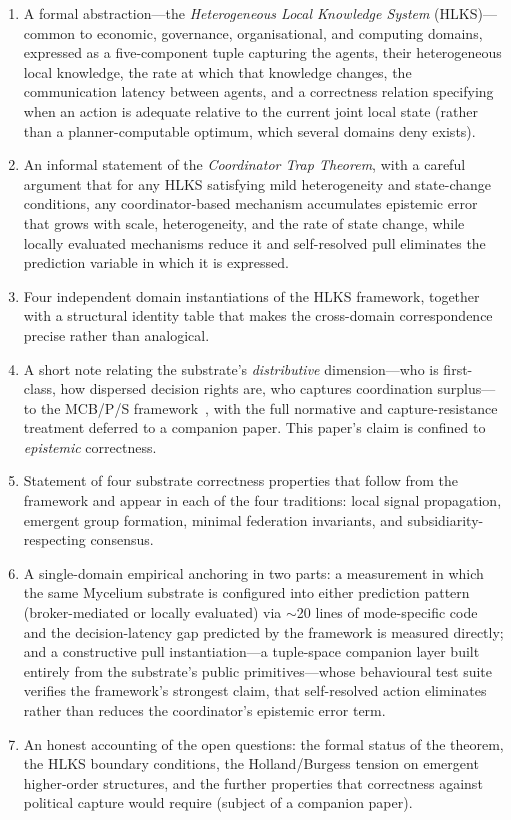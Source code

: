 \documentclass[11pt]{article}
\theoremstyle{definition}
\theoremstyle{plain}
\theoremstyle{plain}
\begin{document}
\begin{enumerate}
\item A formal abstraction---the \emph{Heterogeneous Local Knowledge System}
  (HLKS)---common to economic, governance, organisational, and computing
  domains, expressed as a five-component tuple capturing the agents, their
  heterogeneous local knowledge, the rate at which that knowledge changes, the
  communication latency between agents, and a correctness relation specifying when
  an action is adequate relative to the current joint local state (rather than a
  planner-computable optimum, which several domains deny exists).

\item An informal statement of the \emph{Coordinator Trap Theorem}, with a
  careful argument that for any HLKS satisfying mild heterogeneity and
  state-change conditions, any coordinator-based mechanism accumulates
  epistemic error that grows with scale, heterogeneity, and the rate of
  state change, while locally evaluated mechanisms reduce it and self-resolved pull
  eliminates the prediction variable in which it is expressed.

\item Four independent domain instantiations of the HLKS framework, together
  with a structural identity table that makes the cross-domain correspondence
  precise rather than analogical.

\item A short note relating the substrate's \emph{distributive} dimension---who is
  first-class, how dispersed decision rights are, who captures coordination
  surplus---to the MCB/P/S framework~\cite{nicholson2025}, with the full normative
  and capture-resistance treatment deferred to a companion paper. This paper's claim
  is confined to \emph{epistemic} correctness.

\item Statement of four substrate correctness properties that follow from
  the framework and appear in each of the four traditions: local signal
  propagation, emergent group formation, minimal federation invariants, and
  subsidiarity-respecting consensus.

\item A single-domain empirical anchoring in two parts: a measurement in
  which the same Mycelium substrate is configured into either prediction
  pattern (broker-mediated or locally evaluated) via $\sim$20 lines of
  mode-specific code and the decision-latency gap predicted by the
  framework is measured directly; and a constructive pull
  instantiation---a tuple-space companion layer built entirely from the
  substrate's public primitives---whose behavioural test suite verifies
  the framework's strongest claim, that self-resolved action eliminates
  rather than reduces the coordinator's epistemic error term.

\item An honest accounting of the open questions: the formal status of the
  theorem, the HLKS boundary conditions, the Holland/Burgess tension on
  emergent higher-order structures, and the further properties that
  correctness against political capture would require (subject of a
  companion paper).
\end{enumerate}
\end{document}
